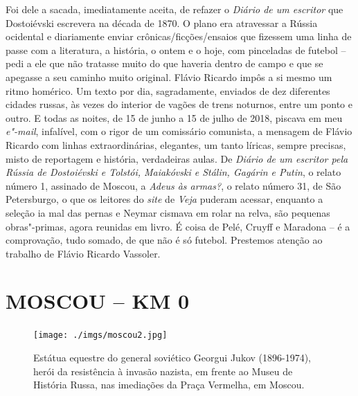 Foi dele a sacada, imediatamente aceita, de refazer o \emph{Diário de um
escritor} que Dostoiévski escrevera na década de 1870. O plano era
atravessar a Rússia ocidental e diariamente enviar
crônicas/ficções/ensaios que fizessem uma linha de passe com a
literatura, a história, o ontem e o hoje, com pinceladas de futebol --
pedi a ele que não tratasse muito do que haveria dentro de campo e que
se apegasse a seu caminho muito original. Flávio Ricardo impôs a si
mesmo um ritmo homérico. Um texto por dia, sagradamente, enviados de dez
diferentes cidades russas, às vezes do interior de vagões de trens
noturnos, entre um ponto e outro. E todas as noites, de 15 de junho a 15
de julho de 2018, piscava em meu \emph{e"-mail}, infalível, com o rigor
de um comissário comunista, a mensagem de Flávio Ricardo com linhas
extraordinárias, elegantes, um tanto líricas, sempre precisas, misto de
reportagem e história, verdadeiras aulas. De \emph{Diário de um escritor
pela Rússia de Dostoiévski e Tolstói, Maiakóvski e Stálin, Gagárin e
Putin}, o relato número 1, assinado de Moscou, a \emph{Adeus às armas?},
o relato número 31, de São Petersburgo, o que os leitores do \emph{site}
de \emph{Veja} puderam acessar, enquanto a seleção ia mal das pernas e
Neymar cismava em rolar na relva, são pequenas obras"-primas, agora
reunidas em livro. É coisa de Pelé, Cruyff e Maradona -- é a
comprovação, tudo somado, de que não é só futebol. Prestemos atenção ao
trabalho de Flávio Ricardo Vassoler.


\makeatletter\@openrightfalse
\movetooddpage
\part*{MOSCOU -- KM 0}


\movetoevenpage
\begin{absolutelynopagebreak}
\begin{vplace}
\begin{figure}[H]
\begin{adjustwidth}{-1.8cm}{}
  \vspace{2.7cm}
  \texttt{[image: ./imgs/moscou2.jpg]}  
\end{adjustwidth}
  \caption{Estátua equestre do general soviético Georgui Jukov (1896-1974), herói da resistência à invasão nazista, em frente ao Museu de História Russa, nas imediações da Praça Vermelha, em Moscou.}

\thispagestyle{empty}

\end{figure}
\end{vplace}

\end{absolutelynopagebreak}

